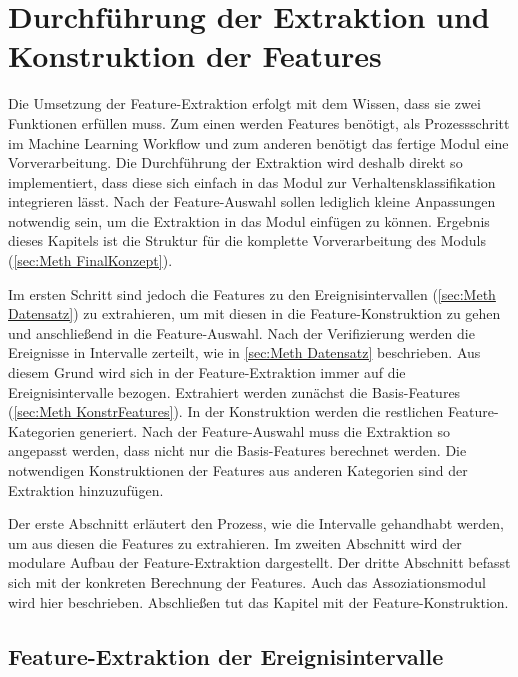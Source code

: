  \section{Durchführung der Extraktion und Konstruktion der Features} \label{secc:Umsetz Featextr}
Die Umsetzung der Feature-Extraktion erfolgt mit dem Wissen, dass sie zwei Funktionen erfüllen muss. Zum einen werden Features benötigt, als Prozessschritt im Machine Learning Workflow und zum anderen benötigt das fertige Modul eine Vorverarbeitung. Die Durchführung der Extraktion wird deshalb direkt so implementiert, dass diese sich einfach in das Modul zur Verhaltensklassifikation integrieren lässt. Nach der Feature-Auswahl sollen lediglich kleine Anpassungen notwendig sein, um die Extraktion in das Modul einfügen zu können. Ergebnis dieses Kapitels ist die Struktur für die komplette Vorverarbeitung des Moduls (\autoref{sec:Meth FinalKonzept}).\par

Im ersten Schritt sind jedoch die Features zu den Ereignisintervallen (\autoref{sec:Meth Datensatz}) zu extrahieren, um mit diesen in die Feature-Konstruktion zu gehen und anschließend in die Feature-Auswahl. Nach der Verifizierung werden die Ereignisse in Intervalle zerteilt, wie in \autoref{sec:Meth Datensatz} beschrieben. Aus diesem Grund wird sich in der Feature-Extraktion immer auf die Ereignisintervalle bezogen. Extrahiert werden zunächst die Basis-Features (\autoref{sec:Meth KonstrFeatures}). In der Konstruktion werden die restlichen Feature-Kategorien generiert. Nach der Feature-Auswahl muss die Extraktion so angepasst werden, dass nicht nur die Basis-Features berechnet werden. Die notwendigen Konstruktionen der Features aus anderen Kategorien sind der Extraktion hinzuzufügen. \par

Der erste Abschnitt erläutert den Prozess, wie die Intervalle gehandhabt werden, um aus diesen die Features zu extrahieren. Im zweiten Abschnitt wird der modulare Aufbau der Feature-Extraktion dargestellt. Der dritte Abschnitt befasst sich mit der konkreten Berechnung der Features. Auch das Assoziationsmodul wird hier beschrieben. Abschließen tut das Kapitel mit der Feature-Konstruktion. 



\subsection{Feature-Extraktion der Ereignisintervalle} \label{sec:Umse ExtrIntervalls}

